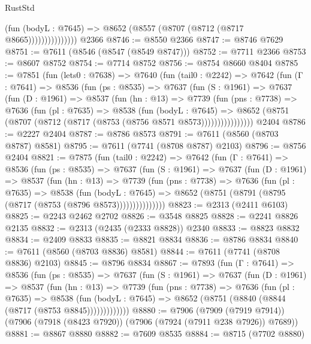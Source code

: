 \begin{lexlean}{RustStd}
\begin{coremodule}
{\begin{coremodule}
{{{{{{{{{{{{{{{{{{{{{{{{{{{{{{{{{{                        (fun (bodyL : @7645) =>
                        @8652 (@8557 (@8707 (@8712 (@8717 @8665)))))))))))))))
    @2366
@8746 := @8550 @2366
@8747 := @8746 @7629
@8751 := @7611 (@8546 (@8547 (@8549 @8747)))
@8752 := @7711 @2366
@8753 := @8607 @8752
@8754 := @7714 @8752
@8756 := @8754 @8660 @8404
@8785 := @7851
    (fun (lets0 : @7638) =>
    @7640
      (fun (tail0 : @2242) =>
      @7642
        (fun (Γ : @7641) =>
        @8536
          (fun (ps : @8535) =>
          @7637
            (fun (S : @1961) =>
            @7637
              (fun (D : @1961) =>
              @8537
                (fun (hn : @13) =>
                @7739
                  (fun (pns : @7738) =>
                  @7636
                    (fun (pl : @7635) =>
                    @8538
                      (fun (bodyL : @7645) =>
                      @8652 (@8751 (@8707 (@8712 (@8717 (@8753 (@8756 @8571 @8573))))))))))))))))
    @2404
@8786 := @2227 @2404
@8787 := @8786 @8573
@8791 := @7611 (@8560 (@8703 @8787) @8581)
@8795 := @7611 (@7741 (@8708 @8787) @2103)
@8796 := @8756 @2404
@8821 := @7875
    (fun (tail0 : @2242) =>
    @7642
      (fun (Γ : @7641) =>
      @8536
        (fun (ps : @8535) =>
        @7637
          (fun (S : @1961) =>
          @7637
            (fun (D : @1961) =>
            @8537
              (fun (hn : @13) =>
              @7739
                (fun (pns : @7738) =>
                @7636
                  (fun (pl : @7635) =>
                  @8538
                    (fun (bodyL : @7645) =>
                    @8652 (@8751 (@8791 (@8795 (@8717 (@8753 (@8796 @8573)))))))))))))))
@8823 := @2313 (@2411 @6103)
@8825 := @2243 @2462 @2702
@8826 := @3548 @8825
@8828 := @2241 @8826 @2135
@8832 := @2313 (@2435 (@2333 @8828)) @2340
@8833 := @8823 @8832
@8834 := @2409 @8833
@8835 := @8821 @8834
@8836 := @8786 @8834
@8840 := @7611 (@8560 (@8703 @8836) @8581)
@8844 := @7611 (@7741 (@8708 @8836) @2103)
@8845 := @8796 @8834
@8867 := @7893
    (fun (Γ : @7641) =>
    @8536
      (fun (ps : @8535) =>
      @7637
        (fun (S : @1961) =>
        @7637
          (fun (D : @1961) =>
          @8537
            (fun (hn : @13) =>
            @7739
              (fun (pns : @7738) =>
              @7636
                (fun (pl : @7635) =>
                @8538
                  (fun (bodyL : @7645) =>
                  @8652 (@8751 (@8840 (@8844 (@8717 (@8753 @8845)))))))))))))
@8880 := @7906
    (@7909 (@7919 @7914))
    (@7906 (@7918 (@8423 @7920)) (@7906 (@7924 (@7911 @238 @7926)) @7689))
@8881 := @8867 @8880
@8882 := @7609 @8535
@8884 := @8715 (@7702 @8880)
}}}}}}}}}}}}}}}}}}}}}}}}}}}}}}}}}}
\end{coremodule}}
\end{coremodule}
\end{lexlean}
